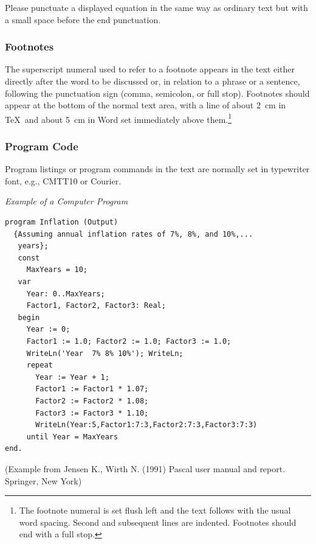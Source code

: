 Please punctuate a displayed equation in the same way as ordinary
text but with a small space before the end punctuation.

\subsubsection{Footnotes}

The superscript numeral used to refer to a footnote appears in the text either directly after the word to be discussed or, in relation to a phrase or a sentence, following the punctuation sign (comma, semicolon, or full stop). Footnotes should appear at the bottom of the normal text area, with a line of about 2~cm in \TeX\ and about 5~cm in Word set immediately above them.\footnote{The footnote numeral is set flush left and the text follows with the usual word spacing. Second and subsequent lines are indented. Footnotes should end with a full stop.}


\subsubsection{Program Code}

Program listings or program commands in the text are normally set in typewriter font, e.g., CMTT10 or Courier.

\noindent
{\it Example of a Computer Program}
\begin{verbatim}
program Inflation (Output)
  {Assuming annual inflation rates of 7%, 8%, and 10%,...
   years};
   const
     MaxYears = 10;
   var
     Year: 0..MaxYears;
     Factor1, Factor2, Factor3: Real;
   begin
     Year := 0;
     Factor1 := 1.0; Factor2 := 1.0; Factor3 := 1.0;
     WriteLn('Year  7% 8% 10%'); WriteLn;
     repeat
       Year := Year + 1;
       Factor1 := Factor1 * 1.07;
       Factor2 := Factor2 * 1.08;
       Factor3 := Factor3 * 1.10;
       WriteLn(Year:5,Factor1:7:3,Factor2:7:3,Factor3:7:3)
     until Year = MaxYears
end.
\end{verbatim}
%
\noindent
{\small (Example from Jensen K., Wirth N. (1991) Pascal user manual and
report. Springer, New York)}

